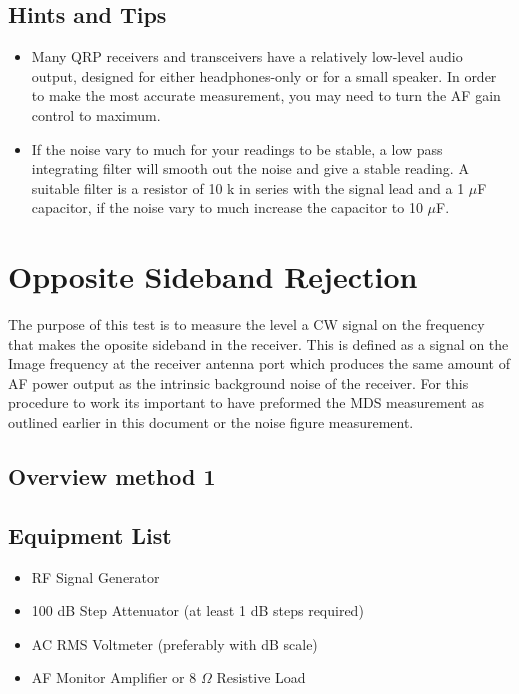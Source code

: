 \documentclass[10pt,letterpaper]{book}
\begin{document}
\subsection*{Hints and Tips}
\begin{itemize}
	\item Many QRP receivers and transceivers have a relatively low-level audio output, designed for either headphones-only or for a small speaker. In order to make the most accurate measurement, you may need to turn the AF gain control to maximum.
	\item If the noise vary to much for your readings to be stable, a low pass integrating filter will smooth out the noise and give a stable reading. A suitable filter is a resistor of 10 k in series with the signal lead and a 1 $\mu$F capacitor, if the noise vary to much increase the capacitor to 10 $\mu$F.  
	
\end{itemize}
\newpage

\section{Opposite Sideband Rejection}
The purpose of this test is to measure the level a CW signal on the frequency that makes the oposite sideband in the receiver.
This is defined as a signal on the Image frequency at the receiver antenna port which produces the same amount of AF power output as the intrinsic background noise of the receiver.  For this procedure to work its important to have preformed the MDS measurement as outlined earlier in this document or the noise figure measurement.
\subsection*{Overview method 1}
\subsection*{Equipment List}
\begin{itemize}
	\item RF Signal Generator
	\item 100 dB Step Attenuator (at least 1 dB steps required)
	\item AC RMS Voltmeter (preferably with dB scale)
	\item AF Monitor Amplifier or 8 $\Omega$ Resistive Load
\end{itemize}
\end{document}

